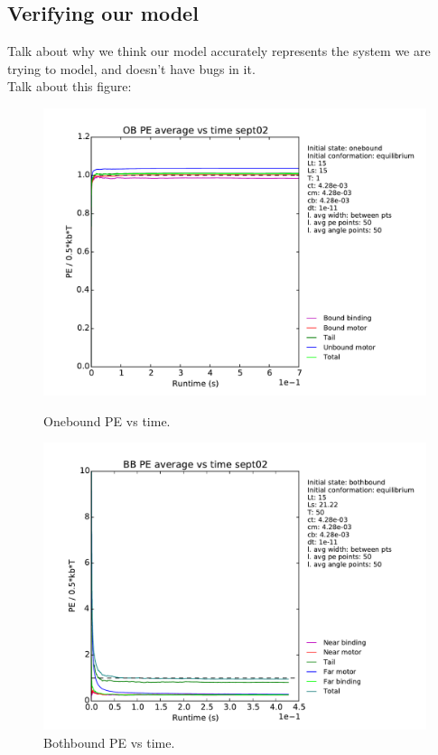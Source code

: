 \documentclass[10pt]{article} %
\begin{document}
\subsection{Verifying our model}
Talk about why we think our model accurately represents the system we are trying to model, and
doesn't have bugs in it.\\

Talk about this figure:

\begin{figure}[h!]
  \centering

  \begin{minipage}[b]{0.49\textwidth}
    \includegraphics[width=\textwidth]{../figures/OB_Average_PE.pdf}
    \caption{Onebound PE vs time.}
  \end{minipage}
  \begin{minipage}[b]{0.49\textwidth}
    \includegraphics[width=\textwidth]{../figures/BB_Average_PE.pdf}
    \caption{Bothbound PE vs time.}
  \end{minipage}
  \label{fig:equipartition_agreement}
\end{figure}
\end{document}
